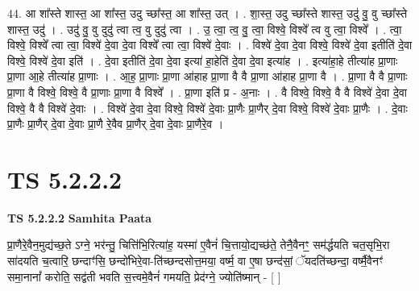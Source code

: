 \documentclass[17pt]{extarticle}
\begin{document}
44. आ शा᳚स्ते शास्त॒ आ शा᳚स्त॒ उदु च्छा᳚स्त॒ आ शा᳚स्त॒ उत् । . शा॒स्त॒ उदु च्छा᳚स्ते शास्त॒ उदु॑ वु॒ वु च्छा᳚स्ते शास्त॒ उदु॑ । . उदु॑ वु॒ वु दुदु॑ त्वा त्व॒ वु दुदु॑ त्वा । . उ॒ त्वा॒ त्व॒ वु॒ त्वा॒ विश्वे॒ विश्वे᳚ त्व वु त्वा॒ विश्वे᳚ । . त्वा॒ विश्वे॒ विश्वे᳚ त्वा त्वा॒ विश्वे॑ दे॒वा दे॒वा विश्वे᳚ त्वा त्वा॒ विश्वे॑ दे॒वाः । . विश्वे॑ दे॒वा दे॒वा विश्वे॒ विश्वे॑ दे॒वा इतीति॑ दे॒वा विश्वे॒ विश्वे॑ दे॒वा इति॑ । . दे॒वा इतीति॑ दे॒वा दे॒वा इत्या॑ हा॒हेति॑ दे॒वा दे॒वा इत्या॑ह । . इत्या॑हा॒हे तीत्या॑ह प्रा॒णाः प्रा॒णा आ॒हे तीत्या॑ह प्रा॒णाः । . आ॒ह॒ प्रा॒णाः प्रा॒णा आ॑हाह प्रा॒णा वै वै प्रा॒णा आ॑हाह प्रा॒णा वै । . प्रा॒णा वै वै प्रा॒णाः प्रा॒णा वै विश्वे॒ विश्वे॒ वै प्रा॒णाः प्रा॒णा वै विश्वे᳚ । . प्रा॒णा इति॑ प्र - अ॒नाः । . वै विश्वे॒ विश्वे॒ वै वै विश्वे॑ दे॒वा दे॒वा विश्वे॒ वै वै विश्वे॑ दे॒वाः । . विश्वे॑ दे॒वा दे॒वा विश्वे॒ विश्वे॑ दे॒वाः प्रा॒णैः प्रा॒णैर् दे॒वा विश्वे॒ विश्वे॑ दे॒वाः प्रा॒णैः । . दे॒वाः प्रा॒णैः प्रा॒णैर् दे॒वा दे॒वाः प्रा॒णै रे॒वैव प्रा॒णैर् दे॒वा दे॒वाः प्रा॒णैरे॒व । \newline
\pagebreak
{}

\section{ TS 5.2.2.2 }

\textbf{TS 5.2.2.2 } \newline
\textbf{Samhita Paata} \newline

प्रा॒णैरे॒वैन॒मुद्य॑च्छ॒ते ऽग्ने॒ भर॑न्तु॒ चित्ति॑भि॒रित्या॑ह॒ यस्मा॑ ए॒वैनं॑ चि॒त्तायो॒द्यच्छ॑ते॒ तेनै॒वैनꣳ॒॒ सम॑र्द्धयति चत॒सृभि॒रा सा॑दयति च॒त्वारि॒ छन्दाꣳ॑सि॒ छन्दो॑भिरे॒वा-ति॑च्छन्दसोत्त॒मया॒ वर्ष्म॒ वा ए॒षा छन्द॑सां॒ ॅयदति॑च्छन्दा॒ वर्ष्मै॒वैनꣳ॑ समा॒नानां᳚ करोति॒ सद्व॑ती भवति स॒त्त्वमे॒वैनं॑ गमयति॒ प्रेद॑ग्ने॒ ज्योति॑ष्मान् - [  ] \newline
\end{document}
